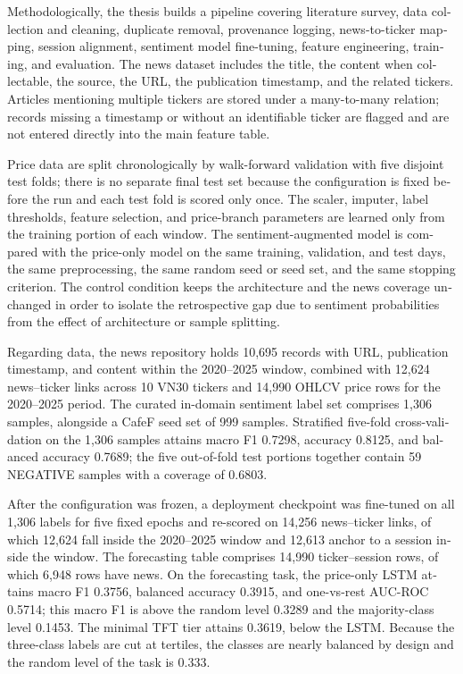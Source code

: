 \begin{otherlanguage}{english}
Methodologically, the thesis builds a pipeline covering literature survey, data
collection and cleaning, duplicate removal, provenance logging, news-to-ticker
mapping, session alignment, sentiment model fine-tuning, feature engineering,
training, and evaluation. The news dataset includes the title, the content when
collectable, the source, the URL, the publication timestamp, and the related
tickers. Articles mentioning multiple tickers are stored under a many-to-many
relation; records missing a timestamp or without an identifiable ticker are
flagged and are not entered directly into the main feature table.

Price data are split chronologically by walk-forward validation with five
disjoint test folds; there is no separate final test set because the
configuration is fixed before the run and each test fold is scored only once. The
scaler, imputer, label thresholds, feature selection, and price-branch parameters
are learned only from the training portion of each window. The
sentiment-augmented model is compared with the price-only model on the same
training, validation, and test days, the same preprocessing, the same random seed
or seed set, and the same stopping criterion. The control condition keeps the
architecture and the news coverage unchanged in order to isolate the
retrospective gap due to sentiment probabilities from the effect of architecture
or sample splitting.

Regarding data, the news repository holds 10,695 records with URL, publication
timestamp, and content within the 2020--2025 window, combined with 12,624
news--ticker links across 10 VN30 tickers and 14,990 OHLCV price rows for the
2020--2025 period. The curated in-domain sentiment label set comprises 1,306
samples, alongside a CafeF seed set of 999 samples. Stratified five-fold
cross-validation on the 1,306 samples attains macro F1 0.7298, accuracy 0.8125,
and balanced accuracy 0.7689; the five out-of-fold test portions together contain
59 NEGATIVE samples with a coverage of 0.6803.

After the configuration was frozen, a deployment checkpoint was fine-tuned on all
1,306 labels for five fixed epochs and re-scored on 14,256 news--ticker links, of
which 12,624 fall inside the 2020--2025 window and 12,613 anchor to a session
inside the window. The forecasting table comprises 14,990 ticker--session rows,
of which 6,948 rows have news. On the forecasting task, the price-only LSTM
attains macro F1 0.3756, balanced accuracy 0.3915, and one-vs-rest AUC-ROC
0.5714; this macro F1 is above the random level 0.3289 and the majority-class
level 0.1453. The minimal TFT tier attains 0.3619, below the LSTM. Because the
three-class labels are cut at tertiles, the classes are nearly balanced by design
and the random level of the task is 0.333.


\end{otherlanguage}

